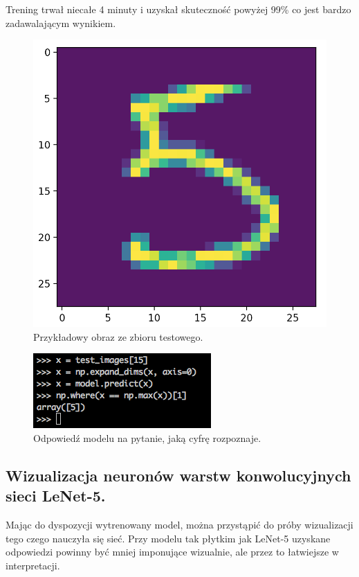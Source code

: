 Trening trwał niecałe 4 minuty i uzyskał skuteczność powyżej 99\% co jest bardzo zadawalającym wynikiem.

\begin{figure}[ht]
\centerline{\includegraphics[scale=0.5]{resources/example_digit_lenet5.png}}
\caption{Przykładowy obraz ze zbioru testowego.}
\label{fig:lenet5-digit}
\end{figure}

\begin{figure}[ht]
\centerline{\includegraphics[scale=0.5]{resources/example_digit_lenet5_response.png}}
\caption{Odpowiedź modelu na pytanie, jaką cyfrę rozpoznaje.}
\label{fig:lenet5-response}
\end{figure}

\subsection{Wizualizacja neuronów warstw konwolucyjnych sieci LeNet-5.}
Mając do dyspozycji wytrenowany model, można przystąpić do próby wizualizacji tego czego nauczyła się sieć. Przy modelu tak płytkim jak LeNet-5 uzyskane odpowiedzi powinny być mniej imponujące wizualnie, ale przez to łatwiejsze w interpretacji.

